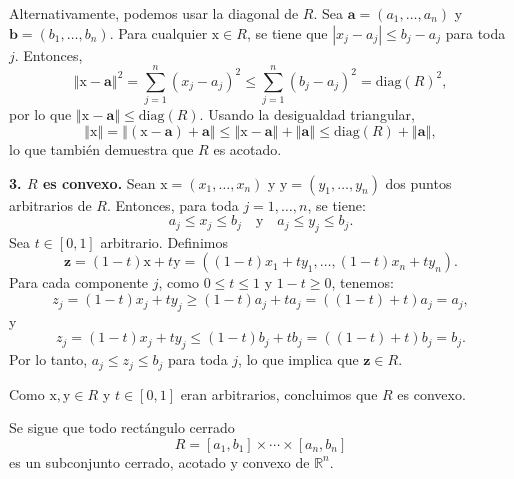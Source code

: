 \documentclass[12pt]{article}
\newcommand{\abs}[1]{\left\vert#1\right\vert}
\newcommand{\norm}[1]{\left\Vert#1\right\Vert}
\newcommand{\diag}{\mathrm{diag}}
\newcommand{\R}{\mathbb R}
\newcommand{\x}{\mathrm x}
\newcommand{\y}{\mathrm y}
\begin{document}
\begin{enumerate}
Alternativamente, podemos usar la diagonal de $R$. Sea $\mathbf{a} = (a_1, \ldots, a_n)$ y $\mathbf{b} = (b_1, \ldots, b_n)$. Para cualquier $\x \in R$, se tiene que $\abs{x_j - a_j} \leq b_j - a_j$ para toda $j$. Entonces,
\[
\norm{\x - \mathbf{a}}^2 = \sum_{j=1}^{n} (x_j - a_j)^2 \leq \sum_{j=1}^{n} (b_j - a_j)^2 = \diag(R)^2,
\]
por lo que $\norm{\x - \mathbf{a}} \leq \diag(R)$. Usando la desigualdad triangular,
\[
\norm{\x} = \norm{(\x - \mathbf{a}) + \mathbf{a}} \leq \norm{\x - \mathbf{a}} + \norm{\mathbf{a}} \leq \diag(R) + \norm{\mathbf{a}},
\]
lo que también demuestra que $R$ es acotado.

\textbf{3. $R$ es convexo.}
Sean $\x = (x_1, \ldots, x_n)$ y $\y = (y_1, \ldots, y_n)$ dos puntos arbitrarios de $R$. Entonces, para toda $j = 1, \ldots, n$, se tiene:
\[
a_j \leq x_j \leq b_j \quad \text{y} \quad a_j \leq y_j \leq b_j.
\]
Sea $t \in [0,1]$ arbitrario. Definimos
\[
\mathbf{z} = (1-t)\x + t\y = ((1-t)x_1 + ty_1, \ldots, (1-t)x_n + ty_n).
\]
Para cada componente $j$, como $0 \leq t \leq 1$ y $1-t \geq 0$, tenemos:
\[
z_j = (1-t)x_j + ty_j \geq (1-t)a_j + ta_j = ((1-t) + t)a_j = a_j,
\]
y
\[
z_j = (1-t)x_j + ty_j \leq (1-t)b_j + tb_j = ((1-t) + t)b_j = b_j.
\]
Por lo tanto, $a_j \leq z_j \leq b_j$ para toda $j$, lo que implica que $\mathbf{z} \in R$.

Como $\x, \y \in R$ y $t \in [0,1]$ eran arbitrarios, concluimos que $R$ es convexo.

Se sigue que todo rectángulo cerrado
\[
R = [a_1,b_1]\times \cdots\times [a_n,b_n]
\]
es un subconjunto cerrado, acotado y convexo de $\R^n$.

\end{enumerate}
\end{document}

